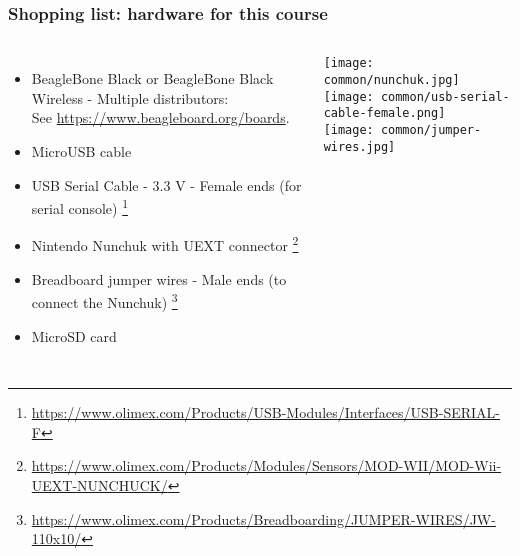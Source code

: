 \begin{frame}
\frametitle{Shopping list: hardware for this course}
  \begin{columns}
    \footnotesize
    \begin{itemize}
    \item BeagleBone Black or BeagleBone Black Wireless - Multiple distributors: \\
      See \url{https://www.beagleboard.org/boards}.
    \item MicroUSB cable
    \item USB Serial Cable - 3.3 V - Female ends (for serial console)
      \footnote{\tiny \url{https://www.olimex.com/Products/USB-Modules/Interfaces/USB-SERIAL-F}}
    \item Nintendo Nunchuk with UEXT connector
      \footnote{\tiny \url{https://www.olimex.com/Products/Modules/Sensors/MOD-WII/MOD-Wii-UEXT-NUNCHUCK/}}
    \item Breadboard jumper wires - Male ends (to connect the Nunchuk)
      \footnote{\tiny \url{https://www.olimex.com/Products/Breadboarding/JUMPER-WIRES/JW-110x10/}}
    \item MicroSD card
    \end{itemize}
    \texttt{[image: common/nunchuk.jpg]} \\
    \texttt{[image: common/usb-serial-cable-female.png]} \\
    \texttt{[image: common/jumper-wires.jpg]}
  \end{columns}
\end{frame}

